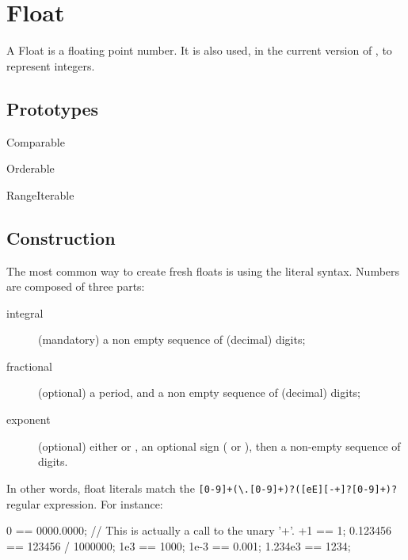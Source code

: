 
\section{Float}

A Float is a floating point number.  It is also used, in the current
version of \us, to represent integers.

\subsection{Prototypes}

\begin{refObjects}
\item[Comparable]
\item[Orderable]
\item[RangeIterable]
\end{refObjects}

\subsection{Construction}
\label{sec:float:ctor}

The most common way to create fresh floats is using the literal
syntax.  Numbers are composed of three parts:
\begin{description}
\item[integral] (mandatory) a non empty sequence of (decimal) digits;
\item[fractional] (optional) a period, and a non empty sequence of
  (decimal) digits;
\item[exponent] (optional) either  or , an optional
  sign (\samp{+} or \samp{-}), then a non-empty sequence of digits.
\end{description}

In other words, float literals match the
\lstinline|[0-9]+(\.[0-9]+)?([eE][-+]?[0-9]+)?|
regular expression.  For instance:

\begin{urbiassert}
0 == 0000.0000;
// This is actually a call to the unary '+'.
+1 == 1;
0.123456 == 123456 / 1000000;
1e3 == 1000;
1e-3 == 0.001;
1.234e3 == 1234;
\end{urbiassert}


